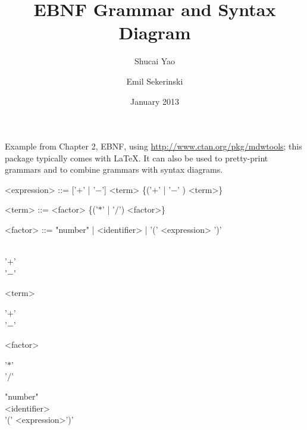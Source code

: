 \documentclass{article}
\title{EBNF Grammar and Syntax Diagram}
\author{Shucai Yao \and Emil Sekerinski}
\date{January 2013}
\begin{document}
\maketitle

\noindent Example from Chapter 2, EBNF, using \url{http://www.ctan.org/pkg/mdwtools}; this package typically comes with \LaTeX. It can also be used to pretty-print grammars and to combine grammars with syntax diagrams.

\begin{grammar}
<expression> ::= ['$+$' | '$-$'] <term> \{('$+$' | '$-$' ) <term>\}

<term> ::= <factor> \{('$*$' | '$/$') <factor>\}

<factor> ::= "number" | <identifier>  | '(' <expression> ')'
\end{grammar}


\begin{syntdiag}
\begin{stack}\\'$+$'\\'$-$'\end{stack}\begin{rep} <term>\\ \begin{stack}'$+$'\\'$-$'\end{stack}\end{rep}
\end{syntdiag}

\begin{syntdiag}
\begin{rep} <factor>\\ \begin{stack}'$*$'\\'$/$'\end{stack}\end{rep}
\end{syntdiag} 

\begin{syntdiag} 
\begin{stack} "number"\\<identifier>\\'(' <expression>')'\end{stack} 
\end{syntdiag} 
\end{document}
